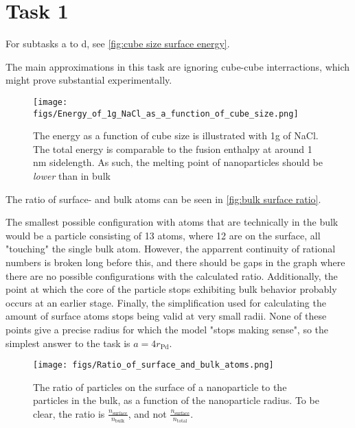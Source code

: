 







\section{Task 1}

    For subtasks a to d, see \autoref{fig:cube size surface energy}.

    The main approximations in this task are ignoring cube-cube interractions, 
    which might prove substantial experimentally.

    \begin{figure}[bh]
        \texttt{[image: figs/Energy\_of\_1g\_NaCl\_as\_a\_function\_of\_cube\_size.png]}

        \caption{The energy as a function of cube size is 
        illustrated with 1g of NaCl. 
        The total energy is comparable to the fusion enthalpy at 
        around 1 nm sidelength. 
        As such, the melting point of nanoparticles should be 
        \textit{lower} than in bulk}
        \label{fig:cube size surface energy}
    \end{figure}

    The ratio of surface- and bulk atoms can be seen in \autoref{fig:bulk surface ratio}.

    The smallest possible configuration with atoms that are technically in the bulk
    would be a particle consisting of 13 atoms, where 12 are on the surface, 
    all "touching" the single bulk atom. 
    However, the apparrent continuity of rational numbers is 
    broken long before this, and there should be gaps in the graph
    where there are no possible configurations with the calculated ratio.
    Additionally, the point at which the core of the particle stops
    exhibiting bulk behavior probably occurs at an earlier stage. 
    Finally, the simplification used for calculating the amount of
    surface atoms stops being valid at very small radii. 
    None of these points give a precise radius for which the model
    "stops making sense", so the simplest answer to the task is $a = 4r_{\text{Pd}}$.

    \begin{figure}[h]
        \texttt{[image: figs/Ratio\_of\_surface\_and\_bulk\_atoms.png]}

        \caption{The ratio of particles on the surface of a nanoparticle
        to the particles in the bulk, as a function of the nanoparticle radius.
        To be clear, the ratio is $\frac{n_\text{surface}}{n_\text{bulk}}$, 
        and not $\frac{n_\text{surface}}{n_\text{total}}$.
        }
        \label{fig:bulk surface ratio}
    \end{figure}

